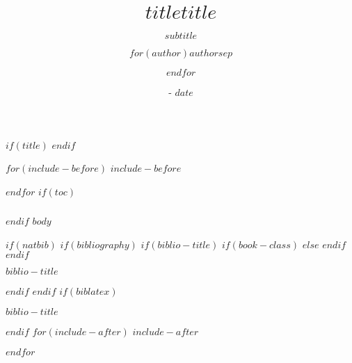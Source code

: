 \documentclass[$if(fontsize)$$fontsize$,$endif$$if(lang)$$lang$,$endif$$if(handout)$handout,$endif$$if(beamer)$ignorenonframetext,$endif$$for(classoption)$$classoption$$sep$,$endfor$$if(aspectratio)$aspectratio=$aspectratio$,$endif$]{$documentclass$}
\title[$shorttitle$]{$title$}
\title{$title$}
\subtitle{$subtitle$}
\author{$for(author)$$author$$sep$ \and $endfor$}
\institute{$for(institute)$$institute$$sep$ \and $endfor$}
\date{- $date$}
\date{}
\newif\ifbibliography
\begin{document}
$if(title)$
\frame{\titlepage}
$endif$


$for(include-before)$
$include-before$

$endfor$
$if(toc)$
\begin{frame}
\frametitle{\contentsname}
\tableofcontents
\end{frame}

$endif$
$body$

$if(natbib)$
$if(bibliography)$
$if(biblio-title)$
$if(book-class)$
\renewcommand\bibname{$biblio-title$}
$else$
\renewcommand\refname{$biblio-title$}
$endif$
$endif$
\begin{frame}[allowframebreaks]{$biblio-title$}
\bibliographytrue

\end{frame}

$endif$
$endif$
$if(biblatex)$
\begin{frame}[allowframebreaks]{$biblio-title$}
\bibliographytrue
\printbibliography[heading=none]
\end{frame}

$endif$
$for(include-after)$
$include-after$

$endfor$
\end{document}
